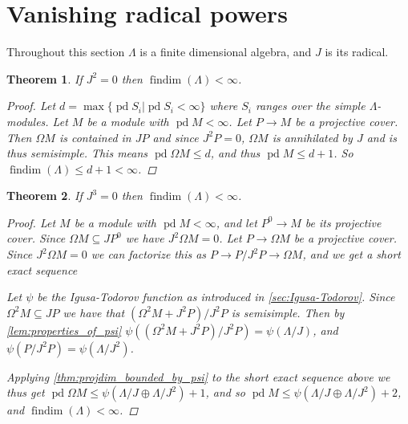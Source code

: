 \documentclass[11pt, a4paper, english]{article}
\newtheorem{theorem}{Theorem}[section]
\theoremstyle{definition}
\DeclareMathOperator{\findim}{findim}
\DeclareMathOperator{\pd}{pd}
\begin{document}
\section{Vanishing radical powers}
Throughout this section $\Lambda$ is a finite dimensional algebra, and $J$ is its radical.

\begin{theorem}
	If $J^2=0$ then $\findim(\Lambda) < \infty$.
	\begin{proof}
		Let $d = \max\{\pd S_i | \pd S_i < \infty\}$ where $S_i$ ranges over the simple $\Lambda$-modules. Let $M$ be a module with $\pd M < \infty$. Let $P \to M$ be a projective cover. Then $\Omega M$ is contained in $JP$ and since $J^2P=0$, $\Omega M$ is annihilated by $J$ and is thus semisimple. This means $\pd \Omega M \leq d$, and thus $\pd M \leq d+1$. So $\findim(\Lambda) \leq d+1 < \infty$.
	\end{proof}
\end{theorem}

\begin{theorem}\cite[Corollary~6]{IgTo05}
	If $J^3=0$ then $\findim(\Lambda) < \infty$.
	\begin{proof}
		Let $M$ be a module with $\pd M < \infty$, and let $P^0 \to M$ be its projective cover. Since $\Omega M \subseteq JP^0$ we have $J^2\Omega M = 0$. Let $P \to \Omega M$ be a projective cover. Since $J^2\Omega M = 0$ we can factorize this as $P \to P/J^2P \to \Omega M$, and we get a short exact sequence
		\begin{center}
		\end{center}
		Let $\psi$ be the Igusa-Todorov function as introduced in \cref{sec:Igusa-Todorov}. Since $\Omega^2 M \subseteq JP$ we have that $(\Omega^2 M + J^2P) / J^2 P$ is semisimple. Then by \cref{lem:properties_of_psi} $\psi((\Omega^2 M + J^2P) / J^2 P) = \psi(\Lambda / J)$, and $\psi(P / J^2 P) = \psi(\Lambda / J^2)$.
		
		Applying \cref{thm:projdim_bounded_by_psi} to the short exact sequence above we thus get $\pd \Omega M \leq \psi(\Lambda / J \oplus \Lambda / J^2) + 1$, and so $\pd M \leq \psi(\Lambda / J \oplus \Lambda / J^2) + 2$, and $\findim(\Lambda) < \infty$.
	\end{proof}
\end{theorem}
\end{document}
